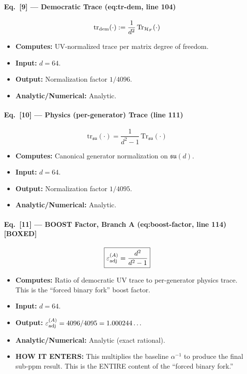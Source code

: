 \paragraph{Eq.\ [9] --- Democratic Trace (eq:tr-dem, line 104)}
\[
  \mathrm{tr}_{\rm dem}(\cdot) := \frac{1}{d^2}\,\mathrm{Tr}_{\mathcal{H}_F}(\cdot)
\]
\begin{itemize}
  \item \textbf{Computes:} UV-normalized trace per matrix degree of freedom.
  \item \textbf{Input:} $d = 64$.
  \item \textbf{Output:} Normalization factor $1/4096$.
  \item \textbf{Analytic/Numerical:} Analytic.
\end{itemize}

\paragraph{Eq.\ [10] --- Physics (per-generator) Trace (line 111)}
\[
  \mathrm{tr}_{\mathfrak{su}}(\cdot) = \frac{1}{d^2 - 1}\,
  \mathrm{Tr}_{\mathfrak{su}}(\cdot)
\]
\begin{itemize}
  \item \textbf{Computes:} Canonical generator normalization on $\mathfrak{su}(d)$.
  \item \textbf{Input:} $d = 64$.
  \item \textbf{Output:} Normalization factor $1/4095$.
  \item \textbf{Analytic/Numerical:} Analytic.
\end{itemize}

\paragraph{Eq.\ [11] --- BOOST Factor, Branch A (eq:boost-factor, line 114) \textbf{[BOXED]}}
\[
  \boxed{\varepsilon_{\rm adj}^{(A)} = \frac{d^2}{d^2 - 1}}
\]
\begin{itemize}
  \item \textbf{Computes:} Ratio of democratic UV trace to per-generator physics trace.
        This is the ``forced binary fork'' boost factor.
  \item \textbf{Input:} $d = 64$.
  \item \textbf{Output:} $\varepsilon_{\rm adj}^{(A)} = 4096/4095 = 1.000244\ldots$
  \item \textbf{Analytic/Numerical:} Analytic (exact rational).
  \item \textbf{HOW IT ENTERS:} This multiplies the baseline $\alpha^{-1}$ to produce
        the final sub-ppm result. This is the ENTIRE content of the ``forced binary fork.''
\end{itemize}

